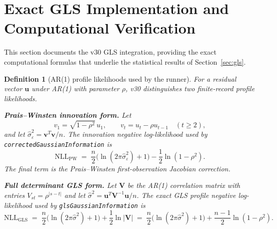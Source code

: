 \documentclass[11pt]{article}
\newtheorem{definition}{Definition}
\begin{document}
\section{Exact GLS Implementation and Computational Verification}
\label{sec:gls-implementation}

This section documents the v30 GLS integration, providing the exact computational formulas that underlie the statistical results of Section~\ref{sec:gls}.

\begin{definition}[AR(1) profile likelihoods used by the runner]\label{def:gls-nll}
For a residual vector $\bm{u}$ under AR(1) with parameter $\rho$, v30 distinguishes two finite-record profile likelihoods.

\textbf{Prais--Winsten innovation form.} Let
\[
v_1=\sqrt{1-\rho^2}\,u_1,\qquad v_t=u_t-\rho u_{t-1}\quad(t\geq2),
\]
and let $\hat{\sigma}_\varepsilon^2=\bm{v}^T\bm{v}/n$. The innovation negative log-likelihood used by \texttt{correctedGaussian\allowbreak{}Information} is
\begin{equation}\label{eq:pw-nll}
\mathrm{NLL}_{\mathrm{PW}}\;=\;\frac{n}{2}\bigl(\ln(2\pi\hat{\sigma}_\varepsilon^2)+1\bigr)-\frac{1}{2}\ln(1-\rho^2).
\end{equation}
The final term is the Prais--Winsten first-observation Jacobian correction.

\textbf{Full determinant GLS form.} Let $\bm{V}$ be the AR(1) correlation matrix with entries $V_{st}=\rho^{|s-t|}$ and let $\hat{\sigma}^2=\bm{u}^T\bm{V}^{-1}\bm{u}/n$. The exact GLS profile negative log-likelihood used by \texttt{glsGaussianInformation} is
\begin{equation}\label{eq:gls-nll-det}
\mathrm{NLL}_{\mathrm{GLS}}\;=\;\frac{n}{2}\bigl(\ln(2\pi\hat{\sigma}^2)+1\bigr)+\frac{1}{2}\ln|\bm{V}|
\;=\;\frac{n}{2}\bigl(\ln(2\pi\hat{\sigma}^2)+1\bigr)+\frac{n-1}{2}\ln(1-\rho^2).
\end{equation}
\end{definition}
\end{document}
